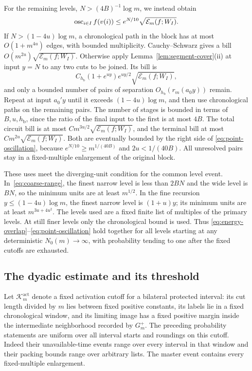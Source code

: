 For the remaining levels, \(N>(4B)^{-1}\log m\), we instead
obtain
\begin{equation}
\label{eq:point-oscillation}
 \operatorname{osc}_{i\in I}f(v(i))
 \le e^{N/10}\sqrt{\mathcal E_m(f;W_I)}.
\end{equation}
If \(N>(1-4u)\log m\), a chronological path in the block has
at most \(O(1+m^{4u})\) edges, with bounded multiplicity.
Cauchy--Schwarz gives a bill
\(O(m^{2u})\sqrt{\mathcal E_m(f;W_I)}\).
Otherwise apply Lemma~\ref{lem:segment-cover}(ii) at input
\(y=N\) to any two cuts to be joined.  Its bill is
\[
 C_{h_{\mathrm b}}(1+e^{uy})e^{uy/2}
       \sqrt{\mathcal E_m(f;W_I)},
\]
and only a bounded number of pairs of separation
\(O_{h_{\mathrm b}}(r_m(a_0y))\) remain.  Repeat at input
\(a_0'y\) until it exceeds \((1-4u)\log m\), and then use
chronological paths on the remaining pairs.  The number of
stages is bounded in terms of \(B,u,h_{\mathrm b}\), since
the ratio of the final input to the first is at most \(4B\).
The total circuit bill is at most
\(C m^{3u/2}\sqrt{\mathcal E_m(f;W_I)}\), and the terminal
bill at most \(C m^{2u}\sqrt{\mathcal E_m(f;W_I)}\).
Both are eventually bounded by the right side of
\eqref{eq:point-oscillation}, because
\(e^{N/10}\ge m^{1/(40B)}\) and \(2u<1/(40B)\).
All unresolved pairs stay in a fixed-multiple enlargement
of the original block.

These uses meet the diverging-unit condition for the common
level event.  In~\eqref{eq:coarse-range}, the finest narrow
level is less than \(2BN\) and the wide level is \(BN\), so
the minimum units are at least \(m^{1/2}\).  In the fine
recursion \(y\le(1-4u)\log m\), the finest narrow level is
\((1+u)y\); its minimum units are at least
\(m^{3u+4u^2}\).  The levels used are a fixed finite list
of multiples of the primary levels.  At still finer levels
only the chronological bound is used.  Thus
\eqref{eq:energy-overlap}--\eqref{eq:point-oscillation}
hold together for all levels starting at any deterministic
\(N_0(m)\to\infty\), with probability tending to one after
the fixed cutoffs are exhausted.

\subsection{The dyadic estimate and its threshold}

Let \(\mathcal K_m^{\mathrm{act}}\) denote a fixed activation cutoff
for a bilateral protected interval:
its cut length divided by \(m\) lies between fixed positive
constants, its labels lie in a fixed chronological window,
and its limiting image has a fixed positive margin inside
the intermediate neighborhood recorded by \(G_m^+\).
The preceding probability statements are uniform over all
interval starts and roundings on this cutoff.  Indeed their
unavailable-time events range over every interval in that
window and their packing bounds range over arbitrary lists.
The master event contains every fixed-multiple enlargement.

